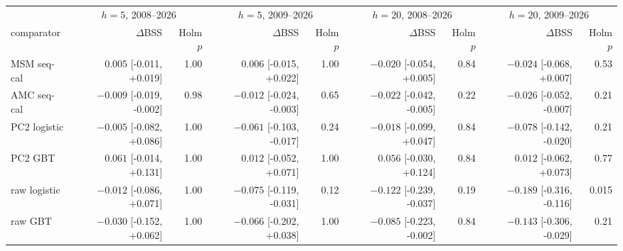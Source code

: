 \begin{tabular}{lrrrrrrrr}\toprule
 & \multicolumn{2}{c}{$h=5$, 2008--2026} & \multicolumn{2}{c}{$h=5$, 2009--2026} & \multicolumn{2}{c}{$h=20$, 2008--2026} & \multicolumn{2}{c}{$h=20$, 2009--2026}\\
comparator & $\Delta$BSS & Holm $p$ & $\Delta$BSS & Holm $p$ & $\Delta$BSS & Holm $p$ & $\Delta$BSS & Holm $p$\\\midrule
MSM seq-cal & $0.005$ {\scriptsize[-0.011, +0.019]} & 1.00 & $0.006$ {\scriptsize[-0.015, +0.022]} & 1.00 & $-0.020$ {\scriptsize[-0.054, +0.005]} & 0.84 & $-0.024$ {\scriptsize[-0.068, +0.007]} & 0.53\\
AMC seq-cal & $-0.009$ {\scriptsize[-0.019, -0.002]} & 0.98 & $-0.012$ {\scriptsize[-0.024, -0.003]} & 0.65 & $-0.022$ {\scriptsize[-0.042, -0.005]} & 0.22 & $-0.026$ {\scriptsize[-0.052, -0.007]} & 0.21\\
PC2 logistic & $-0.005$ {\scriptsize[-0.082, +0.086]} & 1.00 & $-0.061$ {\scriptsize[-0.103, -0.017]} & 0.24 & $-0.018$ {\scriptsize[-0.099, +0.047]} & 0.84 & $-0.078$ {\scriptsize[-0.142, -0.020]} & 0.21\\
PC2 GBT & $0.061$ {\scriptsize[-0.014, +0.131]} & 1.00 & $0.012$ {\scriptsize[-0.052, +0.071]} & 1.00 & $0.056$ {\scriptsize[-0.030, +0.124]} & 0.84 & $0.012$ {\scriptsize[-0.062, +0.073]} & 0.77\\
raw logistic & $-0.012$ {\scriptsize[-0.086, +0.071]} & 1.00 & $-0.075$ {\scriptsize[-0.119, -0.031]} & 0.12 & $-0.122$ {\scriptsize[-0.239, -0.037]} & 0.19 & $-0.189$ {\scriptsize[-0.316, -0.116]} & 0.015\\
raw GBT & $-0.030$ {\scriptsize[-0.152, +0.062]} & 1.00 & $-0.066$ {\scriptsize[-0.202, +0.038]} & 1.00 & $-0.085$ {\scriptsize[-0.223, -0.002]} & 0.84 & $-0.143$ {\scriptsize[-0.306, -0.029]} & 0.21\\
\bottomrule\end{tabular}
